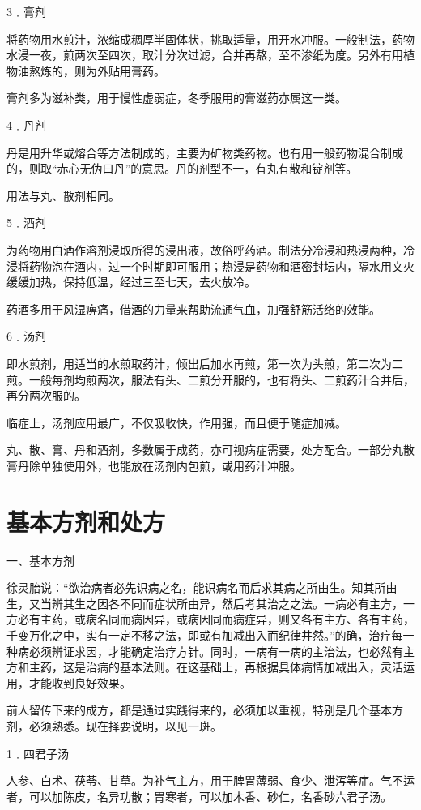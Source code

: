 \documentclass[a4paper,12pt,UTF8,twoside]{ctexbook}
\begin{document}
3﹒膏剂

将药物用水煎汁，浓缩成稠厚半固体状，挑取适量，用开水冲服。一般制法，药物水浸一夜，煎两次至四次，取汁分次过滤，合并再熬，至不渗纸为度。另外有用植物油熬炼的，则为外贴用膏药。

膏剂多为滋补类，用于慢性虚弱症，冬季服用的膏滋药亦属这一类。

4﹒丹剂

丹是用升华或熔合等方法制成的，主要为矿物类药物。也有用一般药物混合制成的，则取“赤心无伪曰丹”的意思。丹的剂型不一，有丸有散和锭剂等。

用法与丸、散剂相同。

5﹒酒剂

为药物用白酒作溶剂浸取所得的浸出液，故俗呼药酒。制法分冷浸和热浸两种，冷浸将药物泡在酒内，过一个时期即可服用；热浸是药物和酒密封坛内，隔水用文火缓缓加热，保持低温，经过三至七天，去火放冷。

药酒多用于风湿痹痛，借酒的力量来帮助流通气血，加强舒筋活络的效能。

6﹒汤剂

即水煎剂，用适当的水煎取药汁，倾出后加水再煎，第一次为头煎，第二次为二煎。一般每剂均煎两次，服法有头、二煎分开服的，也有将头、二煎药汁合并后，再分两次服的。

临症上，汤剂应用最广，不仅吸收快，作用强，而且便于随症加减。

丸、散、膏、丹和酒剂，多数属于成药，亦可视病症需要，处方配合。一部分丸散膏丹除单独使用外，也能放在汤剂内包煎，或用药汁冲服。

\section{基本方剂和处方}

一、基本方剂

徐灵胎说：“欲治病者必先识病之名，能识病名而后求其病之所由生。知其所由生，又当辨其生之因各不同而症状所由异，然后考其治之之法。一病必有主方，一方必有主药，或病名同而病因异，或病因同而病症异，则又各有主方、各有主药，千变万化之中，实有一定不移之法，即或有加减出入而纪律井然。”的确，治疗每一种病必须辨证求因，才能确定治疗方针。同时，一病有一病的主治法，也必然有主方和主药，这是治病的基本法则。在这基础上，再根据具体病情加减出入，灵活运用，才能收到良好效果。

前人留传下来的成方，都是通过实践得来的，必须加以重视，特别是几个基本方剂，必须熟悉。现在择要说明，以见一斑。

1﹒四君子汤

人参、白术、茯苓、甘草。为补气主方，用于脾胃薄弱、食少、泄泻等症。气不运者，可以加陈皮，名异功散；胃寒者，可以加木香、砂仁，名香砂六君子汤。
\end{document}
